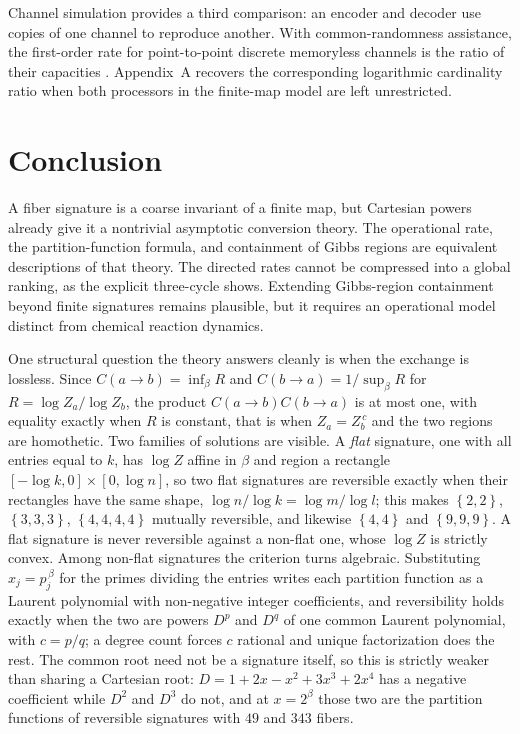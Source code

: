 \documentclass[11pt]{article}
\theoremstyle{definition}
\theoremstyle{remark}
\newcommand{\sig}[1]{\left\{#1\right\}}
\begin{document}
Channel simulation provides a third comparison: an encoder and decoder use
copies of one channel to reproduce another.  With common-randomness
assistance, the first-order rate for point-to-point discrete memoryless
channels is the ratio of their capacities \cite{cao-et-al-2024}.  Appendix~A
recovers the corresponding logarithmic cardinality ratio when both
processors in the finite-map model are left unrestricted.

\section{Conclusion}

A fiber signature is a coarse invariant of a finite map, but Cartesian powers
already give it a nontrivial asymptotic conversion theory.  The operational
rate, the partition-function formula, and containment of Gibbs regions are
equivalent
descriptions of that theory.  The directed rates cannot be compressed into a
global ranking, as the explicit three-cycle shows.  Extending Gibbs-region
containment beyond finite signatures remains plausible, but it requires an
operational model distinct from chemical reaction dynamics.

One structural question the theory answers cleanly is when the exchange
is lossless.  Since
\(C(a\to b)=\inf_\beta R\) and \(C(b\to a)=1/\sup_\beta R\) for
\(R=\log Z_a/\log Z_b\), the product \(C(a\to b)C(b\to a)\) is at most one,
with equality exactly when \(R\) is constant, that is when
\(Z_a=Z_b^{\,c}\) and the two regions are homothetic.  Two families of
solutions are visible.  A \emph{flat} signature, one with all entries equal to
\(k\), has \(\log Z\) affine in \(\beta\) and region a rectangle
\([-\log k,0]\times[0,\log n]\), so two flat signatures are reversible exactly
when their rectangles have the same shape,
\(\log n/\log k=\log m/\log l\); this makes \(\sig{2,2}\), \(\sig{3,3,3}\),
\(\sig{4,4,4,4}\) mutually reversible, and likewise \(\sig{4,4}\) and
\(\sig{9,9,9}\).  A flat signature is never reversible against a non-flat one,
whose \(\log Z\) is strictly convex.  Among non-flat signatures the
criterion turns algebraic.  Substituting \(x_j=p_j^{\,\beta}\) for the primes
dividing the entries writes each partition function as a Laurent polynomial
with non-negative integer coefficients, and reversibility holds exactly when
the two are powers \(D^{p}\) and \(D^{q}\) of one common Laurent polynomial,
with \(c=p/q\); a degree count forces \(c\) rational and unique factorization
does the rest.  The common root need not be a signature itself, so this is
strictly weaker than sharing a Cartesian root: \(D=1+2x-x^2+3x^3+2x^4\) has a
negative coefficient while \(D^2\) and \(D^3\) do not, and at \(x=2^\beta\)
those two are the partition functions of reversible signatures with \(49\) and
\(343\) fibers.
\end{document}
